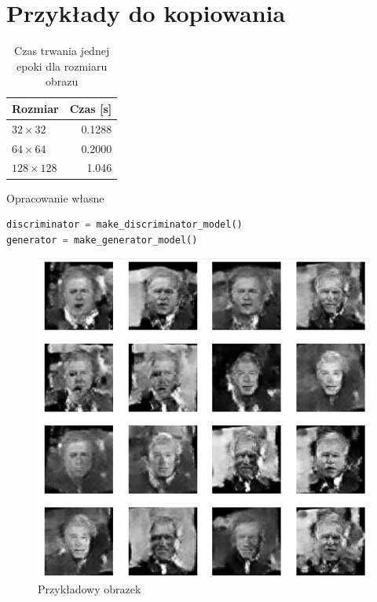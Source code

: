 \documentclass[wi]{zut}
\begin{document}
\section{Przykłady do kopiowania}

\begin{table}[H]
\caption{Czas trwania jednej epoki dla rozmiaru obrazu}
\vspace{1em}
\centering
\begin{tabular}{@{}lr@{}}
\toprule
Rozmiar          & Czas {[}s{]} \\ \midrule
$32 \times 32$   & 0.1288       \\
$64 \times 64$   & 0.2000       \\
$128 \times 128$ & 1.046        \\ \bottomrule
\end{tabular}
\end{table}

{Opracowanie własne}{\label{kod:przyklad}}
\begin{lstlisting}[language=Python]
discriminator = make_discriminator_model()
generator = make_generator_model()
\end{lstlisting}

\begin{figure}[H]
    \centering
    \includegraphics[width=0.7\linewidth]{images/sample.png}
    \caption{Przykładowy obrazek}
    \label{fig:pdgd}
\end{figure}
\end{document}
